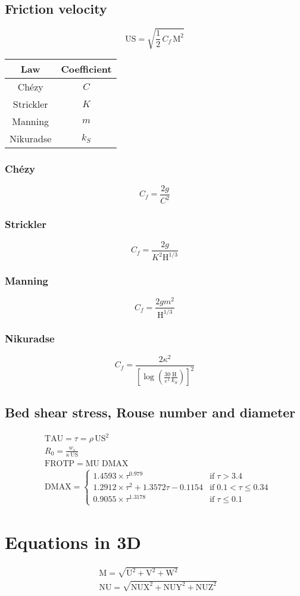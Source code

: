 \documentclass{article}
\newcommand{\HAU}{\mathrm{H}}
\newcommand{\U}{\mathrm{U}}
\newcommand{\V}{\mathrm{V}}
\newcommand{\M}{\mathrm{M}}
\newcommand{\US}{\mathrm{US}}
\newcommand{\DMAX}{\mathrm{DMAX}}
\newcommand{\TAU}{\mathrm{TAU}}
\newcommand{\IF}{\mathrm{if}\;}
\begin{document}
\subsection{Friction velocity}
\[\US = \sqrt{\frac{1}{2}\,C_f\,\M^2}\]

\begin{center}
  \begin{tabular}{ | c | c | }
    \hline
    Law       & Coefficient \\
    \hline
    Chézy     & $C$ \\
    Strickler & $K$ \\
    Manning   & $m$ \\
    Nikuradse & $k_S$ \\
    \hline
  \end{tabular}
\end{center}

\begin{multicols}{2}
\subsubsection{Chézy}
\[C_f = \frac{2 g}{C^2}\]

\subsubsection{Strickler}
\[ C_f = \frac{2 g}{K^2 \HAU^{1/3}}\]

\subsubsection{Manning}
\[ C_f = \frac{2 g m^2}{\HAU^{1/3}}\]

\subsubsection{Nikuradse}

\[ C_f = \frac{2 \kappa^2}{ \left[ \log\left(\frac{30}{e^1} \frac{\HAU}{k_S}\right) \right] ^2} \]
\end{multicols}


\subsection{Bed shear stress, Rouse number and diameter}
\[\begin{aligned}
& \TAU = \tau = \rho \,\US^2\\
& R_0 = \frac{w_s}{\kappa\, \US}\\
& \mathrm{FROTP} = \mathrm{MU} \; \DMAX\\
& \DMAX = \begin{cases}
     1.4593 \times \tau^{0.979} &\IF   \tau > 3.4 \\
     1.2912 \times \tau^2 + 1.3572 \tau - 0.1154
    &\IF 0.1 < \tau \leqslant 0.34 \\
     0.9055 \times \tau^{1.3178} &\IF \tau \leqslant 0.1
  \end{cases}
\end{aligned}\]


\section{Equations in 3D}

\[\begin{aligned}
& \M = \sqrt{\U^2+\V^2+\mathrm{W}^2}\\
& \mathrm{NU} = \sqrt{\mathrm{NUX}^2+\mathrm{NUY}^2+\mathrm{NUZ}^2}
\end{aligned}\]
\end{document}
